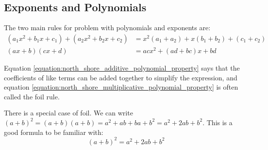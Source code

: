 \documentclass[../main.tex]{subfiles}
\begin{document}
\subsection{Exponents and Polynomials}
%
The two main rules for problem with polynomials and exponents are:
\begin{align}
    (a_1 x^2 + b_1 x + c_1) + (a_2 x^2 + b_2 x + c_2) &= x^2(a_1+a_2) + x (b_1+b_2) + (c_1+c_2)\label{equation:north_shore_additive_polynomial_property}\\
    (ax+b)(cx+d) &= acx^2 + (ad+bc)x + bd\label{equation:north_shore_multiplicative_polynomial_property}
\end{align}
%
\begin{remark}
Equation \ref{equation:north_shore_additive_polynomial_property} says that the coefficients of like terms can be added together to simplify the expression, and equation \ref{equation:north_shore_multiplicative_polynomial_property} is often called the \gls{foil} rule.
\end{remark}
%
\begin{remark}
\label{remark:north_shore_square_of_a_sum_foil}
There is a special case of \gls{foil}. We can write $(a+b)^2 = (a+b)(a+b) = a^2+ab+ba+b^2 = a^2+2ab+b^2$. This is a good formula to be familiar with:
\begin{equation}\label{equation:North_Shore_square_of_a_sum}
    (a+b)^2 = a^2+2ab+b^2
\end{equation}
\end{remark}
%
\end{document}
